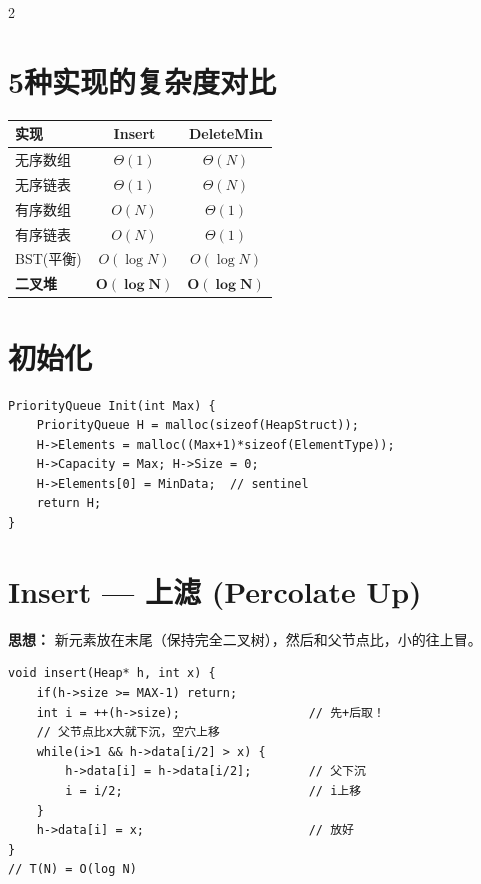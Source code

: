 \documentclass[10pt,a4paper]{article}
\begin{document}
\begin{multicols}{2}

\section*{5种实现的复杂度对比}

\begin{tabular}{|l|c|c|}
\hline
\textbf{实现} & \textbf{Insert} & \textbf{DeleteMin} \\
\hline
无序数组 & $\Theta(1)$ & $\Theta(N)$ \\
无序链表 & $\Theta(1)$ & $\Theta(N)$ \\
有序数组 & $O(N)$ & $\Theta(1)$ \\
有序链表 & $O(N)$ & $\Theta(1)$ \\
BST(平衡) & $O(\log N)$ & $O(\log N)$ \\
\textbf{二叉堆} & $\mathbf{O(\log N)}$ & $\mathbf{O(\log N)}$ \\
\hline
\end{tabular}

\section*{初始化}

\begin{lstlisting}
PriorityQueue Init(int Max) {
    PriorityQueue H = malloc(sizeof(HeapStruct));
    H->Elements = malloc((Max+1)*sizeof(ElementType));
    H->Capacity = Max; H->Size = 0;
    H->Elements[0] = MinData;  // sentinel
    return H;
}
\end{lstlisting}

\section*{Insert — 上滤 (Percolate Up)}

\textbf{思想：} 新元素放在末尾（保持完全二叉树），然后和父节点比，小的往上冒。

\begin{lstlisting}
void insert(Heap* h, int x) {
    if(h->size >= MAX-1) return;
    int i = ++(h->size);                  // 先+后取！
    // 父节点比x大就下沉，空穴上移
    while(i>1 && h->data[i/2] > x) {
        h->data[i] = h->data[i/2];        // 父下沉
        i = i/2;                          // i上移
    }
    h->data[i] = x;                       // 放好
}
// T(N) = O(log N)
\end{lstlisting}


\end{multicols}
\end{document}
